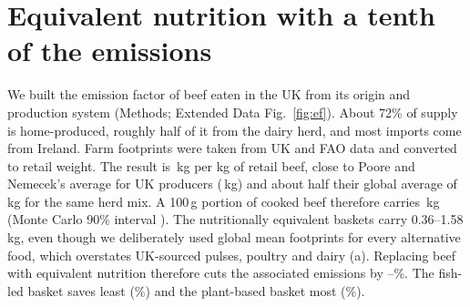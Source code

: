 \documentclass[10pt]{article}
\begin{document}
\begin{table}[t]
\centering\footnotesize
\caption{\textbf{Baskets replacing 100\,g of cooked beef.} Minimum-emission solutions with the key
nutrients as targets and energy capped at \LpEnergyMaxRatio{} times beef's. ``kcal $\times$'' is the
basket's energy relative to beef. ``min. kcal $\times$'' is the least energy at which the scenario can
match all key nutrients (``none'': impossible with realistic portions). Beef itself emits
\PerHundredUkAttr{}\,kg \COtwoe{} per 100\,g (UK supply mix).}
\label{tab:baskets}

\end{table}

\section{Equivalent nutrition with a tenth of the emissions}

We built the emission factor of beef eaten in the UK from its origin and production system
(Methods; Extended Data Fig.~\ref{fig:ef}). About 72\% of supply is home-produced, roughly half of
it from the dairy herd\cite{defra2025auk,ciel2020}, and most imports come from Ireland. Farm
footprints were taken from UK and FAO data\cite{ciel2020,prism2024,gerber2013} and converted to retail
weight. The result is \EfBeefUkAttr{}\,kg \COtwoe{} per kg of retail beef, close to Poore and Nemecek's
average for UK producers (\EfBeefPnUk{}\,kg) and about half their global average of
\EfBeefPnMix{}\,kg for the same herd mix\cite{poore2018}. A 100\,g portion of cooked beef therefore
carries \PerHundredUkAttr{}\,kg \COtwoe{} (Monte Carlo 90\% interval \PerHundredBeefMc{}). The
nutritionally equivalent baskets carry 0.36--1.58\,kg, even though we deliberately used global mean
footprints for every alternative food, which overstates UK-sourced pulses, poultry and dairy
(a). Replacing beef with equivalent nutrition therefore cuts the associated
emissions by \ReductionMin--\ReductionMax\%. The fish-led basket saves least (\PctVsBeefEqFish\%) and
the plant-based basket most (\PctVsBeefEqVegan\%).
\end{document}
